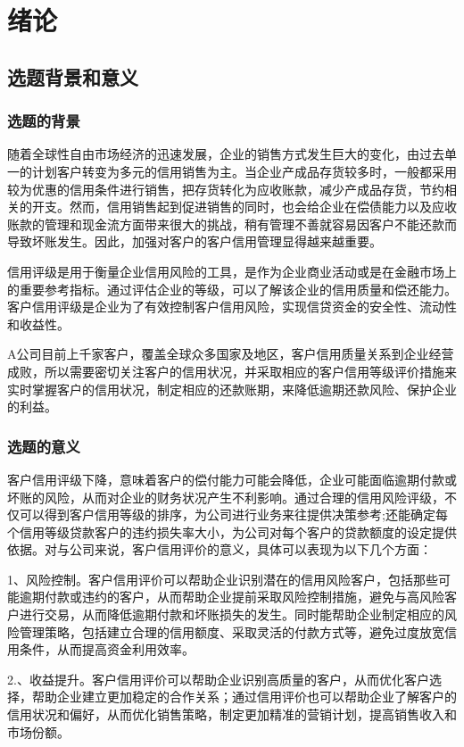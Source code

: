 \chapter{绪论}

\section{选题背景和意义}
\subsection{选题的背景}
随着全球性自由市场经济的迅速发展，企业的销售方式发生巨大的变化，由过去单一的计划客户转变为多元的信用销售为主。当企业产成品存货较多时，一般都采用较为优惠的信用条件进行销售，把存货转化为应收账款，减少产成品存货，节约相关的开支。然而，信用销售起到促进销售的同时，也会给企业在偿债能力以及应收账款的管理和现金流方面带来很大的挑战，稍有管理不善就容易因客户不能还款而导致坏账发生。因此，加强对客户的客户信用管理显得越来越重要。

信用评级是用于衡量企业信用风险的工具，是作为企业商业活动或是在金融市场上的重要参考指标。通过评估企业的等级，可以了解该企业的信用质量和偿还能力。客户信用评级是企业为了有效控制客户信用风险，实现信贷资金的安全性、流动性和收益性。

A公司目前上千家客户，覆盖全球众多国家及地区，客户信用质量关系到企业经营成败，所以需要密切关注客户的信用状况，并采取相应的客户信用等级评价措施来实时掌握客户的信用状况，制定相应的还款账期，来降低逾期还款风险、保护企业的利益。

\subsection{选题的意义}
客户信用评级下降，意味着客户的偿付能力可能会降低，企业可能面临逾期付款或坏账的风险，从而对企业的财务状况产生不利影响。通过合理的信用风险评级，不仅可以得到客户信用等级的排序，为公司进行业务来往提供决策参考;还能确定每个信用等级贷款客户的违约损失率大小，为公司对每个客户的贷款额度的设定提供依据。对与公司来说，客户信用评价的意义，具体可以表现为以下几个方面：

1、风险控制。客户信用评价可以帮助企业识别潜在的信用风险客户，包括那些可能逾期付款或违约的客户，从而帮助企业提前采取风险控制措施，避免与高风险客户进行交易，从而降低逾期付款和坏账损失的发生。同时能帮助企业制定相应的风险管理策略，包括建立合理的信用额度、采取灵活的付款方式等，避免过度放宽信用条件，从而提高资金利用效率。

2.、收益提升。客户信用评价可以帮助企业识别高质量的客户，从而优化客户选择，帮助企业建立更加稳定的合作关系；通过信用评价也可以帮助企业了解客户的信用状况和偏好，从而优化销售策略，制定更加精准的营销计划，提高销售收入和市场份额。


